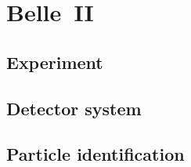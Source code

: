 \chapter{Belle~\RN{2}}
\label{chap:belle2_experiment}

\section{Experiment}
\label{sec:experimental}

\section{Detector system}
\label{sec:detector_system}

\section{Particle identification}
\label{sec:particle_identification}
